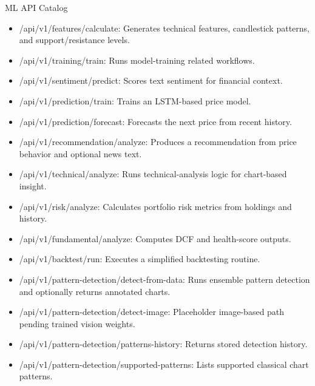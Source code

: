 \documentclass{beamer}
\begin{document}
\begin{frame}{ML API Catalog}
\begin{itemize}
\item /api/v1/features/calculate: Generates technical features, candlestick patterns, and support/resistance levels.
\item /api/v1/training/train: Runs model-training related workflows.
\item /api/v1/sentiment/predict: Scores text sentiment for financial context.
\item /api/v1/prediction/train: Trains an LSTM-based price model.
\item /api/v1/prediction/forecast: Forecasts the next price from recent history.
\item /api/v1/recommendation/analyze: Produces a recommendation from price behavior and optional news text.
\item /api/v1/technical/analyze: Runs technical-analysis logic for chart-based insight.
\item /api/v1/risk/analyze: Calculates portfolio risk metrics from holdings and history.
\item /api/v1/fundamental/analyze: Computes DCF and health-score outputs.
\item /api/v1/backtest/run: Executes a simplified backtesting routine.
\item /api/v1/pattern-detection/detect-from-data: Runs ensemble pattern detection and optionally returns annotated charts.
\item /api/v1/pattern-detection/detect-image: Placeholder image-based path pending trained vision weights.
\item /api/v1/pattern-detection/patterns-history: Returns stored detection history.
\item /api/v1/pattern-detection/supported-patterns: Lists supported classical chart patterns.
\end{itemize}
\end{frame}
\end{document}
